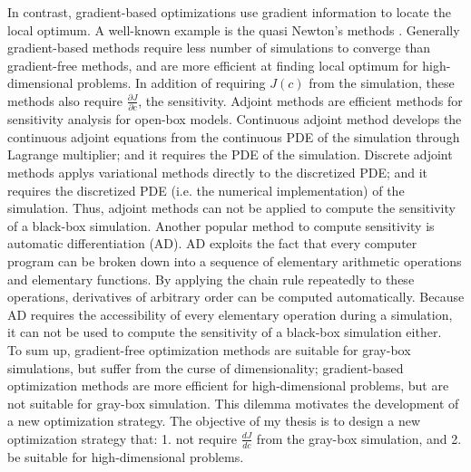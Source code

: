\documentclass[a4paper,onecolumn]{article}
\theoremstyle{remark}
\begin{document}
\noindent In contrast, gradient-based optimizations use gradient information to locate the local optimum.
A well-known example is the quasi Newton's methods \cite{quasiNewton}. 
Generally gradient-based methods require less number of simulations 
to converge than gradient-free methods, and are more efficient at finding local optimum for high-dimensional problems.
In addition of requiring $J(c)$ from the simulation,
these methods also require $\frac{\partial J}{\partial c}$, the sensitivity.
Adjoint methods are efficient methods for sensitivity analysis\cite{cont discretize adjoint}
for open-box models.
Continuous adjoint method develops the continuous adjoint equations from the continuous PDE of the simulation through 
Lagrange multiplier; and it requires the PDE of the simulation. 
Discrete adjoint methods applys variational methods directly to the discretized PDE; and it requires the
discretized PDE (i.e. the numerical implementation) of the simulation. Thus, adjoint methods can not be applied
to compute the sensitivity of a black-box simulation.
Another popular method to compute sensitivity is automatic differentiation (AD)\cite{automaticdiff}.
AD exploits the fact that every computer program can be broken down into a sequence of elementary arithmetic operations
and elementary functions. By applying the chain rule repeatedly to these operations, 
derivatives of arbitrary order can be computed automatically. Because AD requires the accessibility of every elementary 
operation during a simulation, it can not be used to compute the sensitivity of a black-box simulation either.\\

\noindent To sum up, gradient-free optimization methods are suitable for gray-box simulations, but suffer from the curse of
dimensionality; gradient-based optimization methods are more efficient for high-dimensional problems, but are not suitable for 
gray-box simulation. This dilemma motivates the development of a new optimization strategy. 
The objective of my thesis is to design a new optimization strategy that: 1. not require $\frac{dJ}{dc}$ from the gray-box simulation, and 2. be suitable for high-dimensional 
problems.\\
\end{document}
